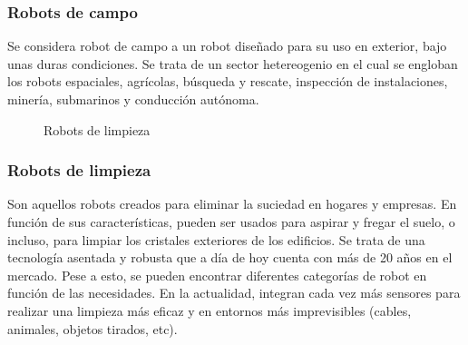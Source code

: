 \subsubsection{Robots de campo}
Se considera robot de campo a un robot diseñado para su uso en exterior, bajo unas duras condiciones. Se trata de un sector hetereogenio en el cual se engloban los 
robots espaciales, agrícolas, búsqueda y rescate, inspección de instalaciones, minería, submarinos y conducción autónoma.
\begin{figure} [h!]
  \centering    
  \hspace{3cm}
  \hspace{3cm}
  \hspace{3cm}
  \caption{Robots de limpieza}
\end{figure}

\subsubsection{Robots de limpieza}
Son aquellos robots creados para eliminar la suciedad en hogares y empresas. En función de sus características, pueden ser usados para aspirar y fregar el suelo, o incluso,
para limpiar los cristales exteriores de los edificios. Se trata de una tecnología asentada y robusta que a día de hoy cuenta con más de 20 años en el mercado. Pese a esto, 
se pueden encontrar diferentes categorías de robot en función de las necesidades. En la actualidad, integran cada vez más sensores para realizar una limpieza más eficaz y 
en entornos más imprevisibles (cables, animales, objetos tirados, etc).

